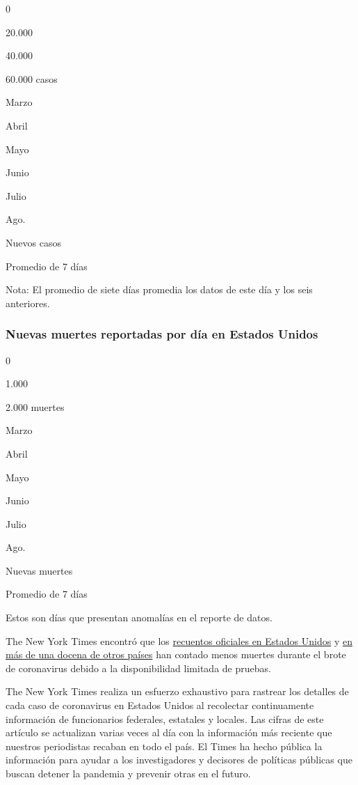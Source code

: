 0

20.000

40.000

60.000 casos

Marzo

Abril

Mayo

Junio

Julio

Ago.

Nuevos casos

Promedio de 7 días

Nota: El promedio de siete días promedia los datos de este día y los
seis anteriores.

\hypertarget{nuevas-muertes-reportadas-por-duxeda-en-estados-unidos}{%
\subsubsection{Nuevas muertes reportadas por día en Estados
Unidos}\label{nuevas-muertes-reportadas-por-duxeda-en-estados-unidos}}

0

1.000

2.000 muertes

Marzo

Abril

Mayo

Junio

Julio

Ago.

Nuevas muertes

Promedio de 7 días

Estos son días que presentan anomalías en el reporte de datos.

The New York Times encontró que los
\href{https://www.nytimes3xbfgragh.onion/interactive/2020/04/28/us/coronavirus-death-toll-total.html}{recuentos
oficiales en Estados Unidos} y
\href{https://www.nytimes3xbfgragh.onion/interactive/2020/04/21/world/coronavirus-missing-deaths.html}{en
más de una docena de otros países} han contado menos muertes durante el
brote de coronavirus debido a la disponibilidad limitada de pruebas.

The New York Times realiza un esfuerzo exhaustivo para rastrear los
detalles de cada caso de coronavirus en Estados Unidos al recolectar
continuamente información de funcionarios federales, estatales y
locales. Las cifras de este artículo se actualizan varias veces al día
con la información más reciente que nuestros periodistas recaban en todo
el país. El Times ha hecho pública la información para ayudar a los
investigadores y decisores de políticas públicas que buscan detener la
pandemia y prevenir otras en el futuro.

